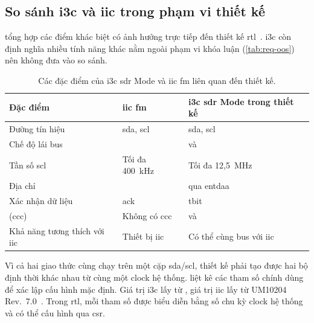 \subsection{So sánh \texorpdfstring{\gls{i3c}}{I3C} và \texorpdfstring{\gls{iic}}{I2C} trong phạm vi thiết kế}
\label{sec:bg-compare}

 tổng hợp các điểm khác biệt có ảnh hưởng trực tiếp đến thiết kế \gls{rtl}~\cites{mipi_i3c_basic}{nxp_i2c}. \gls{i3c}
còn định nghĩa nhiều tính năng khác nằm ngoài phạm vi khóa luận (\cref{tab:req-oos}) nên không đưa
vào so sánh.

\begin{table}[!htbp]
	\centering
	\caption{Các đặc điểm của \gls{i3c} \gls{sdr} Mode và \gls{iic} \gls{fm} liên quan đến thiết kế.}
	\label{tab:i3c-vs-i2c}
	\begin{tabular}{L{4.0cm} L{4.3cm} L{4.6cm}}
		\toprule
		\textbf{Đặc điểm}                  & \textbf{\gls{iic} \gls{fm}} & \textbf{\gls{i3c} \gls{sdr} Mode trong thiết kế} \\
		\midrule
		Đường tín hiệu                     & \gls{sda}, \gls{scl}        & \gls{sda}, \gls{scl}                             \\
		Chế độ lái bus                     & \OpenDrain{}                & \OpenDrain{} và \PushPull{}                      \\
		Tần số \gls{scl}                   & Tối đa 400~kHz              & Tối đa 12,5~MHz                                  \\
		Địa chỉ                            & \StaticAddress{}            & \DynamicAddress{} qua \gls{entdaa}               \\
		Xác nhận dữ liệu                   & \gls{ack}                   & \gls{tbit}                                       \\
		\CommonCommandCode{} (\gls{ccc})   & Không có \gls{ccc}          & \BroadcastCCC{} và \DirectCCC{}                  \\
		Khả năng tương thích với \gls{iic} & Thiết bị \gls{iic}          & Có thể cùng bus với \Target{} \gls{iic}          \\
		\bottomrule
	\end{tabular}
\end{table}

Vì cả hai giao thức cùng chạy trên một cặp \gls{sda}/\gls{scl}, thiết kế phải tạo được hai bộ định thời khác nhau từ
cùng một clock hệ thống.  liệt kê các tham số chính dùng để xác lập cấu hình mặc định.
Giá trị \gls{i3c} lấy từ \MIPIIThreeCBasic{}, giá trị \gls{iic} lấy từ UM10204
Rev.~7.0~\cites{mipi_i3c_basic}{nxp_i2c}. Trong \gls{rtl}, mỗi tham số được biểu diễn bằng số chu kỳ clock hệ
thống và có thể cấu hình qua \gls{csr}.

